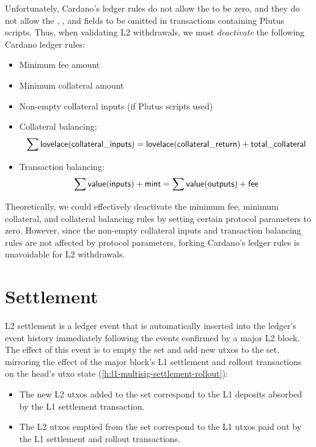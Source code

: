 \documentclass[../hydrozoa.tex]{subfiles}
\begin{document}
Unfortunately, Cardano's ledger rules do not allow the  to be zero, and they do not allow the , , and  fields to be omitted in transactions containing Plutus scripts.
Thus, when validating L2 withdrawals, we must \emph{deactivate} the following Cardano ledger rules:
\begin{itemize}
  \item Minimum fee amount
  \item Minimum collateral amount
  \item Non-empty collateral inputs (if Plutus scripts used)
  \item Collateral balancing:
    \begin{equation*}
      \sum \mathsf{lovelace} (\mathsf{collateral\_inputs}) =
      \mathsf{lovelace} (\mathsf{collateral\_return}) + \mathsf{total\_collateral}
    \end{equation*}
  \item Transaction balancing:
    \begin{equation*}
      \sum \mathsf{value} (\mathsf{inputs}) + \mathsf{mint} =
      \sum \mathsf{value} (\mathsf{outputs}) + \mathsf{fee}
    \end{equation*}
\end{itemize}

Theoretically, we could effectively deactivate the minimum fee, minimum collateral, and collateral balancing rules by setting certain protocol parameters to zero.
However, since the non-empty collateral inputs and transaction balancing rules are not affected by protocol parameters, forking Cardano's ledger rules is unavoidable for L2 withdrawals.

\section{Settlement}%
\label{h:ledger-settlement}%

L2 settlement is a ledger event that is automatically inserted into the ledger's event history immediately following the events confirmed by a major L2 block.
The effect of this event is to empty the  set and add new utxos to the  set, mirroring the effect of the major block's L1 settlement and rollout transactions on the head's utxo state (\cref{h:l1-multisig-settlement-rollout}):
\begin{itemize}
  \item The new L2 utxos added to the  set correspond to the L1 deposits absorbed by the L1 settlement transaction.
  \item The L2 utxos emptied from the  set correspond to the L1 utxos paid out by the L1 settlement and rollout transactions.
\end{itemize}
\end{document}
